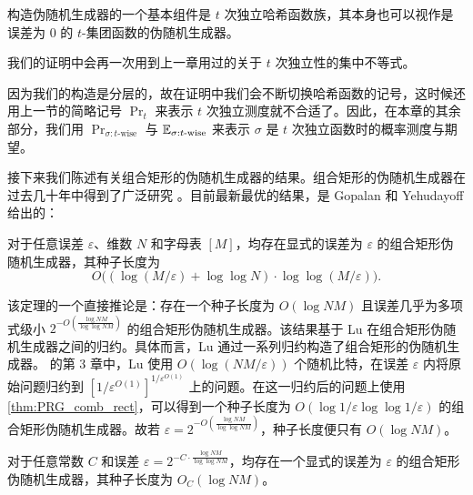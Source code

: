 \PseudoRandomGenerator*

构造伪随机生成器的一个基本组件是 $t$ 次独立哈希函数族，其本身也可以视作是误差为 $0$ 的 $t$-集团函数的伪随机生成器。

\BoundedIndependence*

我们的证明中会再一次用到上一章用过的关于 $t$ 次独立性的集中不等式。

\TWiseTailBound*

因为我们的构造是分层的，故在证明中我们会不断切换哈希函数的记号，这时候还用上一节的简略记号 $\Pr_t$ 来表示 $t$ 次独立测度就不合适了。因此，在本章的其余部分，我们用 $\Pr_{\sigma : t\text{-wise}}$ 与 $\operatorname*{\mathbb{E}}_{\sigma : t\text{-wise}}$ 来表示 $\sigma$ 是 $t$ 次独立函数时的概率测度与期望。

接下来我们陈述有关组合矩形的伪随机生成器的结果。组合矩形的伪随机生成器在过去几十年中得到了广泛研究 \cite{ASWZ96_PRG_rect_comb, LLSZ95,SSZZ00_connection_CR_min_wise, Lu02_domain_reduction, GMRTV, GY20_PRG_CR_SOTA}。目前最新最优的结果，是 Gopalan 和 Yehudayoff \cite{GY20_PRG_CR_SOTA} 给出的：

\begin{theorem}\label{thm:PRG_comb_rect}
    对于任意误差 $\varepsilon$、维数 $N$ 和字母表 $[M]$，均存在显式的误差为 $\varepsilon$ 的组合矩形伪随机生成器，其种子长度为
    $$
    O\big(\left( \log (M / \varepsilon) + \log \log N \right) \cdot \log \log (M/\varepsilon)\big).
    $$
\end{theorem}

该定理的一个直接推论是：存在一个种子长度为 $O(\log NM)$ 且误差几乎为多项式级小 $2^{-O\left(\frac{\log NM}{\log \log NM}\right)}$ 的组合矩形伪随机生成器。该结果基于 Lu \cite{Lu02_domain_reduction} 在组合矩形伪随机生成器之间的归约。具体而言，Lu 通过一系列归约构造了组合矩形的伪随机生成器。\cite{Lu02_domain_reduction} 的第 3 章中，Lu 使用 $O(\log (N M / \varepsilon))$ 个随机比特，在误差 $\varepsilon$ 内将原始问题归约到 $[1/\varepsilon^{O(1)}]^{1/\varepsilon^{O(1)}}$ 上的问题。在这一归约后的问题上使用 \cref{thm:PRG_comb_rect}，可以得到一个种子长度为 $O(\log  1/\varepsilon \log \log 1/\varepsilon)$ 的组合矩形伪随机生成器。故若 $\varepsilon = 2^{-O\left(\frac{\log NM}{\log \log NM}\right)}$，种子长度便只有 $O(\log NM)$。

\begin{corollary}\label{cor:almost_poly_small_error}
    对于任意常数 $C$ 和误差 $\varepsilon = 2^{-C \cdot \frac{\log NM}{\log \log NM}}$，均存在一个显式的误差为 $\varepsilon$ 的组合矩形伪随机生成器，其种子长度为 $O_C(\log NM)$。
\end{corollary}

